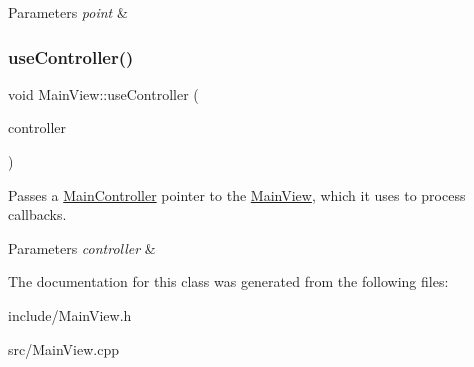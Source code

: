 \begin{DoxyParams}{Parameters}
{\em point} & \\
\hline
\end{DoxyParams}
\mbox{\label{classMainView_a077240bb5f37693cd4764914d69b98eb}} 
\subsubsection{\texorpdfstring{use\+Controller()}{useController()}}
{\footnotesize\ttfamily void Main\+View\+::use\+Controller (\begin{DoxyParamCaption}\item[{\hyperlink{classMainController}{Main\+Controller} $\ast$}]{controller }\end{DoxyParamCaption})}



Passes a \hyperlink{classMainController}{Main\+Controller} pointer to the \hyperlink{classMainView}{Main\+View}, which it uses to process callbacks. 


\begin{DoxyParams}{Parameters}
{\em controller} & \\
\hline
\end{DoxyParams}


The documentation for this class was generated from the following files\+:\begin{DoxyCompactItemize}
\item 
include/Main\+View.\+h\item 
src/Main\+View.\+cpp\end{DoxyCompactItemize}
